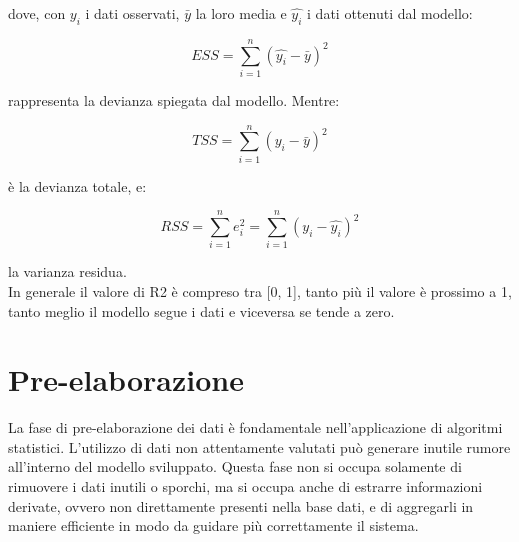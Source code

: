 \documentclass[%
    corpo=12pt,
    twoside,
    oldstyle,
    autoretitolo,
    greek,
    evenboxes,
]{toptesi}
\begin{document}
dove, con $y_i$ i dati osservati, $\bar{y}$ la loro media e $\hat{y_i}$ i dati ottenuti dal modello:
\begin{center}
  \begin{equation}
    ESS = \sum_{i=1}^{n}(\hat{y_i} - \bar{y})^2
  \end{equation}
\end{center}
rappresenta la devianza spiegata dal modello. Mentre:
\begin{center}
  \begin{equation}
    TSS = \sum_{i=1}^{n}(y_i - \bar{y})^2
  \end{equation}
\end{center}
è la devianza totale, e:
\begin{center}
  \begin{equation}
    RSS = \sum_{i=1}^{n}e_i^2 = \sum_{i=1}^{n}(y_i - \hat{y_i})^2
  \end{equation}
\end{center}
la varianza residua.\\
In generale il valore di R2 è compreso tra [0, 1], tanto più il valore è prossimo a 1, tanto meglio il modello segue i dati e viceversa se tende a zero.


\chapter{Pre-elaborazione}
\label{chap:preprocessing}
La fase di pre-elaborazione dei dati è fondamentale nell'applicazione di algoritmi statistici. L'utilizzo di dati non attentamente valutati può generare inutile rumore all'interno del modello sviluppato. Questa fase non si occupa solamente di rimuovere i dati inutili o sporchi, ma si occupa anche di estrarre informazioni derivate, ovvero non direttamente presenti nella base dati, e di aggregarli in maniere efficiente in modo da guidare più correttamente il sistema. 
\end{document}
